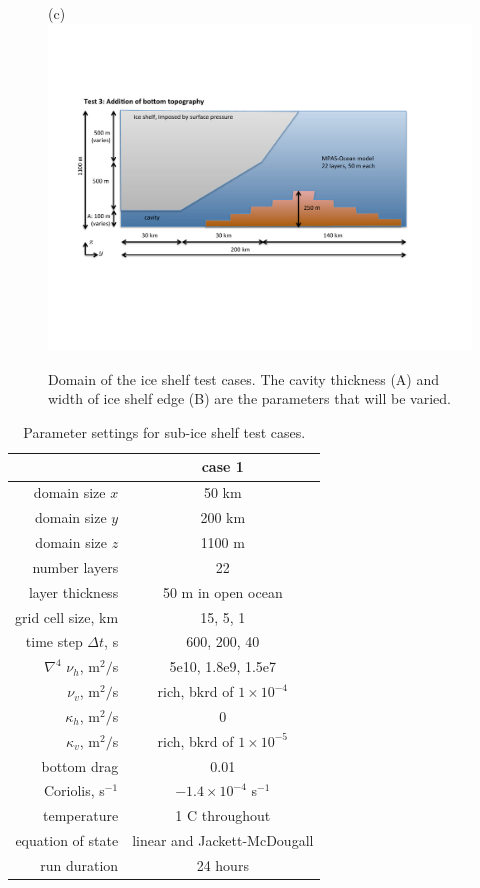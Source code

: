 \documentclass[11pt]{report}
\begin{document}
\begin{figure}[tbh]
\vspace{.2in}
(c)\includegraphics[width=5.75in]{f/sub-ice_shelf_test3.pdf}\\
\caption{Domain of the ice shelf test cases.  The cavity thickness (A) and width of ice shelf edge (B) are the parameters that will be varied.}
\label{figure:ice shelf domain}
\end{figure}


\begin{table}[tbh] 
\caption{Parameter settings for sub-ice shelf test cases.}
\vspace{0.5cm} \centering 
\begin{tabular}{r|c } 
\hline\hline & case 1 \\
\hline 
domain size $x$ &  50 km\\
domain size $y$ & 200 km\\
domain size $z$ &  1100 m \\
number layers& 22 \\
layer thickness & 50 m in open ocean \\
grid cell size, km  & 15, 5, 1 \\
time step $\Delta t$, s & 600, 200, 40 \\
$\nabla^4$ $\nu_h$, m$^2/$s & 5e10, 1.8e9, 1.5e7 \\
$\nu_v$, m$^2/$s & rich, bkrd of $1\times10^{-4}$ \\
$\kappa_h$, m$^2/$s & 0 \\
$\kappa_v$, m$^2/$s & rich, bkrd of $1\times10^{-5}$ \\
bottom drag & 0.01 \\
Coriolis, s$^{-1}$ & $-1.4\times10^{-4}$ s$^{-1}$ \\
temperature & 1 C throughout \\
equation of state & linear and Jackett-McDougall \\
run duration& 24 hours \\
\hline 
\end{tabular} \label{table:ideal test parameters}
\end{table}





\end{document}
